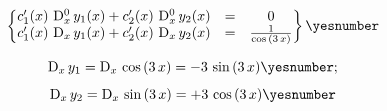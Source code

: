 \documentclass["AM3C-Slides_annotations.tex"]{subfiles}
\begin{document}
\begin{exampleBox}
  \begin{gather*}
    \begin{Bmatrix}
      {
        c_1'(x)\,\mdif[0]{x}\,y_1(x) 
        + c_2'(x)\,\mdif[0]{x}\,y_2(x)
      } &=& 0
      \\ {
        c_1'(x)\,\mdif[1]{x}\,y_1(x) 
        + c_2'(x)\,\mdif[1]{x}\,y_2(x)
      } &=& \frac{1}{\cos{(3\,x)}}
    \end{Bmatrix}
    \yesnumber\label{eq:14-eq_sytem}
  \end{gather*}

  \begin{gather*}
    \mdif[1]{x}\,y_1
    = \mdif[1]{x}\,\cos{(3\,x)}
    = -3\,\sin{(3\,x)}
    \yesnumber\label{eq:14-D_x(y_1)}
    ; \\[1ex]
    \mdif[1]{x}\,y_2
    = \mdif[1]{x}\,\sin{(3\,x)}
    = +3\,\cos{(3\,x)}
    \yesnumber\label{eq:14-D_x(y_2)}
  \end{gather*}

\end{exampleBox}
\end{document}
